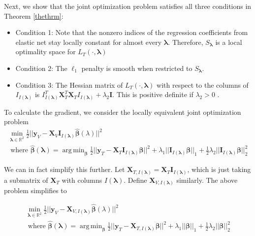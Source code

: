 \documentclass[10pt,letterpaper]{article}
\DeclareMathOperator*{\argmin}{arg\,min}
\begin{document}
Next, we show that the joint optimization problem satisfies all three conditions in Theorem \ref{thethrm}:
\begin{itemize}
\item[] Condition 1: Note that the nonzero indices of the regression coefficients from elastic net stay locally constant for almost every $\boldsymbol{\lambda}$. Therefore, $S_{\boldsymbol{\lambda}}$ is a local optimality space for $L_T(\cdot, \boldsymbol{\lambda})$ \hfill {}
\item[] Condition 2: The $\ell_1$ penalty is smooth when restricted to $S_{\boldsymbol{\lambda}}$.\hfill {}
\item[] Condition 3: The Hessian matrix of $L_T(\cdot, \boldsymbol{\lambda})$ with respect to the columns of $I_{I(\boldsymbol \lambda)}$ is $I_{I(\boldsymbol \lambda)}^T \boldsymbol{X}_{T}^T \boldsymbol{X}_{T} I_{I(\boldsymbol \lambda)} + \lambda_2 \boldsymbol{I}$. This is positive definite if $\lambda_2 > 0$ \hfill {}.
\end{itemize}

To calculate the gradient, we consider the locally equivalent joint optimization problem
\begin{equation}
\begin{array}{c}
\min_{\boldsymbol{\lambda} \in \mathbb{R}^2} \frac{1}{2} \lvert\lvert \boldsymbol{y}_V - \boldsymbol{X}_V \boldsymbol{I}_{I(\boldsymbol \lambda)} \hat{\boldsymbol{\beta}} (\lambda) \rvert\rvert ^2 \\
\text{ where }
\hat{\boldsymbol{\beta}} (\boldsymbol{\lambda}) = \argmin_{\boldsymbol{\beta}} \frac{1}{2} \lvert\lvert \boldsymbol{y}_T - \boldsymbol{X}_T \boldsymbol{I}_{I(\boldsymbol \lambda)} \boldsymbol{\beta} \rvert\rvert ^2
+ \lambda_1 \lvert\lvert \boldsymbol{I}_{I(\boldsymbol \lambda)} \boldsymbol{\beta} \rvert \rvert_1
+ \frac{1}{2}\lambda_2 \lvert\lvert \boldsymbol{I}_{I(\boldsymbol \lambda)} \boldsymbol{\beta} \rvert \rvert_2^2
\end{array}
\end{equation}

We can in fact simplify this further. Let $\boldsymbol{X}_{T, I(\boldsymbol\lambda)} = \boldsymbol{X}_T \boldsymbol{I}_{I(\boldsymbol \lambda)}$, which is just taking a submatrix of $\boldsymbol{X}_T$ with columns $I(\boldsymbol \lambda)$. Define $\boldsymbol{X}_{V, I(\boldsymbol\lambda)}$ similarly. The above problem simplifies to

\begin{equation}
\begin{array}{c}
\min_{\boldsymbol{\lambda} \in \mathbb{R}^2} \frac{1}{2} \lvert\lvert \boldsymbol{y}_V - \boldsymbol{X}_{V, I(\boldsymbol \lambda)} \hat{\boldsymbol{\beta}} (\lambda) \rvert\rvert ^2 \\
\text{ where }
\hat{\boldsymbol{\beta}} (\boldsymbol{\lambda}) = \argmin_{\boldsymbol \beta} \frac{1}{2} \lvert\lvert \boldsymbol{y}_T - \boldsymbol{X}_{T, I(\boldsymbol \lambda)} \boldsymbol \beta \rvert\rvert ^2
+ \lambda_1 \lvert\lvert \boldsymbol \beta \rvert \rvert_1
+ \frac{1}{2}\lambda_2 \lvert\lvert \boldsymbol \beta \rvert \rvert_2^2
\end{array}
\end{equation}
\end{document}

